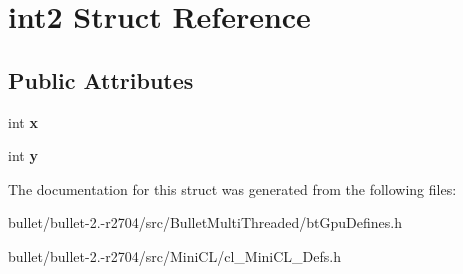 \hypertarget{structint2}{\section{int2 Struct Reference}
\label{structint2}
}
\subsection*{Public Attributes}
\begin{DoxyCompactItemize}
\item 
\hypertarget{structint2_a2b4908d6f7ae421393c0ec0233e90551}{int {\bfseries x}}\label{structint2_a2b4908d6f7ae421393c0ec0233e90551}

\item 
\hypertarget{structint2_a3d7ff3bd7734f8c2f38613a4da5e6c83}{int {\bfseries y}}\label{structint2_a3d7ff3bd7734f8c2f38613a4da5e6c83}

\end{DoxyCompactItemize}


The documentation for this struct was generated from the following files\+:\begin{DoxyCompactItemize}
\item 
bullet/bullet-\/2.-\/r2704/src/\+Bullet\+Multi\+Threaded/bt\+Gpu\+Defines.\+h\item 
bullet/bullet-\/2.-\/r2704/src/\+Mini\+C\+L/cl\+\_\+\+Mini\+C\+L\+\_\+\+Defs.\+h\end{DoxyCompactItemize}
